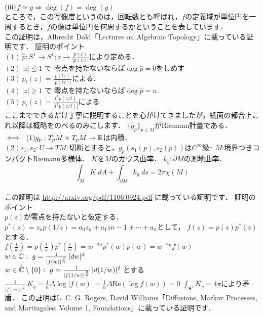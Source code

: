 $\rm (iii)$$f \simeq g \Rightarrow \deg(f) = \deg(g)$\\
\propx
ところで，この写像度というのは，回転数とも呼ばれ，$f$の定義域が単位円を一周するとき，$f$の像は単位円を何周するかということを表しています．
\proof[代数トポロジー的な代数学の基本定理の証明]
\leavevmode\\
この証明は，Albrecht Dold「Lectures on Algebraic Topology」に載っている証明です．
証明のポイント\\
$(1) \ \hat{p}:S^1\to S^1 ; z \to \frac{p(z)}{|p(z)|}$により定める．\\
$(2)\ |z|\le 1$ で 零点を持たないならば$\deg \hat{p} = 0$をしめす\\
$(3)\ p_t(z) =  \frac{p(tz)}{|p(tz)|}$による．\\
$(4)\ |z|\ge 1$ で 零点を持たないならば$\deg \hat{p} = n$.\\
$(5)\ p_t(z) =  \frac{t^kp(z/t)}{|t^kp(z/t)|}$による\\
\proofx
ここまでできるだけ丁寧に説明することを心がけてきましたが，紙面の都合上これ以降は概略をのべるのみにします．
$\{g_p\}_{p\in M}$がRiemann計量である．\\
$\iff \ (1)g_p : T_p M \times T_p M \to \R $は内積．\\
$(2)s_1,s_2:U\to TM:$切断とすると，$g_p(s_1(p),s_2(p))$は$C^\infty$級･
\thm
$M$:境界つきコンパクトRiemann多様体． $K$を$M$のガウス曲率． $k_g:\partial M$の測地曲率．
\[
\int_M K\;dA+\int_{\partial M}k_g\;ds=2\pi\chi(M)
\]
\thmx
\proof[微分幾何学による代数学の基本定理の証明]
\leavevmode\\
この証明は \url{http://arxiv.org/pdf/1106.0924.pdf} に載っている証明です．
証明のポイント\\
$p(z)$が零点を持たないと仮定する．\\
$p^{*}(z) = z_np(1/z) = a_0z_n + a_1z{n-1} + \cdots + a_n$として， $f(z)=p(z)p^*(z)$とする．\\
$f(\tfrac{1}{w}) = p(\tfrac{1}{w})p^*(\tfrac{1}{w}) = w^{-2n}p^*(w)p(w) = w^{-2n}f(w)$\\
$w\in \C :\ g=\frac{1}{|f(w)|^{\frac{2}{n}}}\,|dw|^2$\\
$w\in \hat{\C} \setminus \{0\}:\  g=\frac{1}{|f(1/w)|^{\frac{2}{n}}}\,|d(1/w)|^2$ とする\\
$\frac{1}{|f(w)|^{\frac{1}{n}}}\,K_g=\frac{1}{n}\Delta \log|f(w)|=\frac{1}{n}\Delta \text{Re}(\log f(w))=0$
$\int_{\mathbf{S}^2}K_g=4\pi$により矛盾．
\proofx
{}
\proof[確率論による代数学の基本定理の証明]
この証明はL. C. G. Rogers, David Williams「Diffusions, Markov Processes, and Martingales: Volume 1, Foundations」に載っている証明です．
$$
